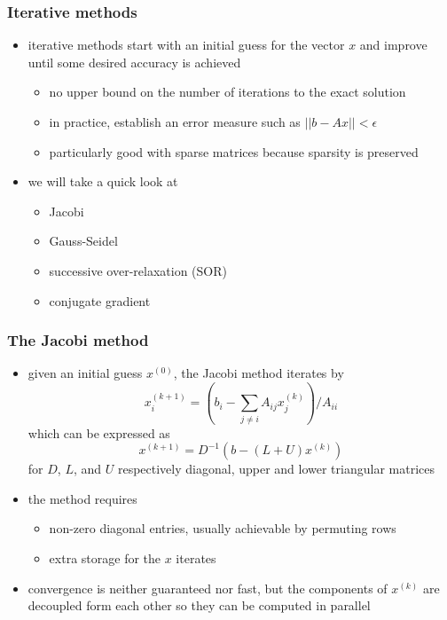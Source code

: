\begin{frame}[fragile]
%
  \frametitle{Iterative methods}
%
  \begin{itemize}
%
  \item iterative methods start with an initial guess for the vector $x$ and improve until some
    desired accuracy is achieved
    \begin{itemize}
    \item no upper bound on the number of iterations to the exact solution
    \item in practice, establish an error measure such as $||b - Ax|| < \epsilon$
    \item particularly good with sparse matrices because sparsity is preserved
    \end{itemize}
  \item we will take a quick look at
    \begin{itemize}
    \item Jacobi
    \item Gauss-Seidel
    \item successive over-relaxation (SOR)
    \item conjugate gradient
    \end{itemize}
%
  \end{itemize}
%
\end{frame}

\begin{frame}[fragile]
%
  \frametitle{The Jacobi method}
%
  \begin{itemize}
%
  \item given an initial guess $x^{(0)}$, the Jacobi method iterates by
    \begin{equation}
      x_{i}^{(k+1)} = \left( b_{i} - \sum_{j\neq i} A_{ij}x_{j}^{(k)} \right) / A_{ii}
    \end{equation}
    which can be expressed as
    \begin{equation}
      x^{(k+1)} = D^{-1} \left( b - (L+U)x^{(k)} \right)
    \end{equation}
    for $D$, $L$, and $U$ respectively diagonal, upper and lower triangular matrices
%
    \item the method requires
      \begin{itemize}
      \item non-zero diagonal entries, usually achievable by permuting rows
      \item extra storage for the $x$ iterates
      \end{itemize}
%
    \item convergence is neither guaranteed nor fast, but the components of $x^{(k)}$ are
      decoupled form each other so they can be computed in parallel
% 
  \end{itemize}
%
\end{frame}

